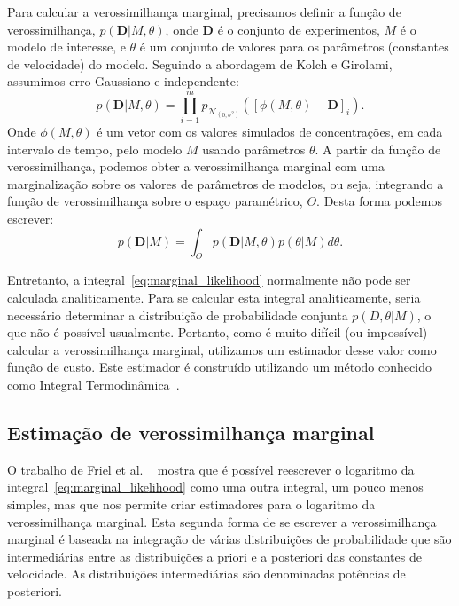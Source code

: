 \documentclass[12pt]{article}
\begin{document}
Para calcular a verossimilhança marginal, precisamos definir a função de
verossimilhança, $p(\mathbf{D} | M, \theta)$, onde $\mathbf{D}$ é o 
conjunto de experimentos, $M$ é o modelo de interesse, e $\theta$ é um
conjunto de valores para os parâmetros (constantes de velocidade) do
modelo. Seguindo a abordagem de Kolch e Girolami, assumimos erro
Gaussiano e independente:
\begin{equation}
    p (\mathbf{D} | M, \theta) = \prod_{i = 1}^m
    p_{\mathcal{N}_{\left(0, \sigma^2\right)}} ([\phi (M,\theta) -
    \mathbf{D}]_i).
\label{eq:likelihood}
\end{equation}
Onde $\phi (M, \theta)$ é um vetor com os valores simulados de 
concentrações, em cada intervalo de tempo, pelo modelo $M$ usando 
parâmetros $\theta$. A partir da função de verossimilhança, podemos
obter a verossimilhança marginal com uma marginalização sobre os valores
de parâmetros de modelos, ou seja, integrando a função de 
verossimilhança sobre o espaço paramétrico, $\Theta$. Desta forma
podemos escrever:
\begin{equation}
    p (\mathbf{D} | M) = \int_{\Theta} p (\mathbf{D} | M, \theta) p
    (\theta | M)d\theta.
\label{eq:marginal_likelihood}
\end{equation}

Entretanto, a integral~\ref{eq:marginal_likelihood} normalmente não pode
ser calculada analiticamente. Para se calcular esta integral
analiticamente, seria necessário determinar a distribuição de 
probabilidade conjunta $p(D, \theta | M)$, o que não é possível
usualmente. Portanto, como é muito difícil (ou impossível) calcular a
verossimilhança marginal, utilizamos um estimador desse valor como 
função de custo. Este estimador é construído utilizando um método
conhecido como Integral Termodinâmica~\cite{Friel2008}.

\subsection{Estimação de verossimilhança marginal}
O trabalho de Friel et al. ~\cite{Friel2008} mostra que é possível
reescrever o logaritmo da integral~\ref{eq:marginal_likelihood} como uma 
outra integral, um pouco menos simples, mas que nos permite criar 
estimadores para o logaritmo da verossimilhança marginal. Esta segunda 
forma de se escrever a verossimilhança marginal é baseada na integração 
de várias distribuições de probabilidade que são intermediárias entre as 
distribuições a priori e a posteriori das constantes de velocidade. As 
distribuições intermediárias são denominadas potências de posteriori.
\end{document}
